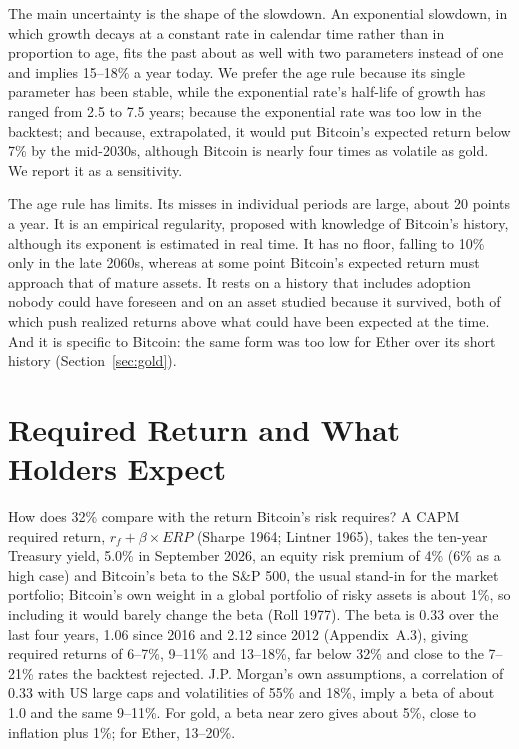 \documentclass[12pt]{article}
\theoremstyle{plain}
\theoremstyle{remark}
\begin{document}
The main uncertainty is the shape of the slowdown. An exponential slowdown, in which growth decays at a constant rate in calendar time rather than in proportion to age, fits the past about as well with two parameters instead of one and implies 15--18\% a year today. We prefer the age rule because its single parameter has been stable, while the exponential rate's half-life of growth has ranged from 2.5 to 7.5 years; because the exponential rate was too low in the backtest; and because, extrapolated, it would put Bitcoin's expected return below 7\% by the mid-2030s, although Bitcoin is nearly four times as volatile as gold. We report it as a sensitivity.

The age rule has limits. Its misses in individual periods are large, about 20 points a year. It is an empirical regularity, proposed with knowledge of Bitcoin's history, although its exponent is estimated in real time. It has no floor, falling to 10\% only in the late 2060s, whereas at some point Bitcoin's expected return must approach that of mature assets. It rests on a history that includes adoption nobody could have foreseen and on an asset studied because it survived, both of which push realized returns above what could have been expected at the time. And it is specific to Bitcoin: the same form was too low for Ether over its short history (Section~\ref{sec:gold}).

\section{Required Return and What Holders Expect}\label{sec:required}

How does 32\% compare with the return Bitcoin's risk requires? A CAPM required return, $r_f+\beta\times\mathit{ERP}$ (Sharpe 1964; Lintner 1965), takes the ten-year Treasury yield, 5.0\% in September 2026, an equity risk premium of 4\% (6\% as a high case) and Bitcoin's beta to the S\&P 500, the usual stand-in for the market portfolio; Bitcoin's own weight in a global portfolio of risky assets is about 1\%, so including it would barely change the beta (Roll 1977). The beta is 0.33 over the last four years, 1.06 since 2016 and 2.12 since 2012 (Appendix~A.3), giving required returns of 6--7\%, 9--11\% and 13--18\%, far below 32\% and close to the 7--21\% rates the backtest rejected. J.P. Morgan's own assumptions, a correlation of 0.33 with US large caps and volatilities of 55\% and 18\%, imply a beta of about 1.0 and the same 9--11\%. For gold, a beta near zero gives about 5\%, close to inflation plus 1\%; for Ether, 13--20\%.
\end{document}
